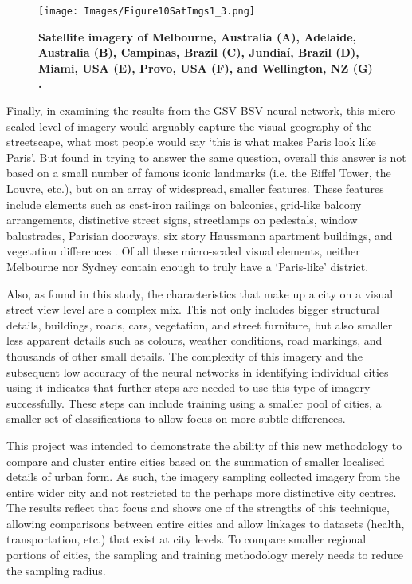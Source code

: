 \documentclass[Crown,sageh,times]{sagej}
\begin{document}
\begin{figure}[!htbp]
\centering    
\texttt{[image: Images/Figure10SatImgs1\_3.png]} 
 \caption{\bf Satellite imagery of Melbourne, Australia (A), Adelaide, Australia (B), Campinas, Brazil (C), Jundia\'{i}, Brazil (D), Miami, USA (E), Provo, USA (F), and Wellington, NZ (G) \citep{GoogleStatic2017}.}    
 \label{fig:satimages}  
\end{figure} 

Finally, in examining the results from the GSV-BSV neural network, this micro-scaled level of imagery would arguably capture the visual geography of the streetscape, what most people would say `this is what makes Paris look like Paris'. But \citet{Doersch2012} found in trying to answer the same question, overall this answer is not based on a small number of famous iconic landmarks (i.e. the Eiffel Tower, the Louvre, etc.), but on an array of widespread, smaller features. These features include elements such as cast-iron railings on balconies, grid-like balcony arrangements, distinctive street signs, streetlamps on pedestals, window balustrades, Parisian doorways, six story Haussmann apartment buildings, and vegetation differences \citep{Li2015}. Of all these micro-scaled visual elements, neither Melbourne nor Sydney contain enough to truly have a `Paris-like' district.

Also, as found in this study, the characteristics that make up a city on a visual street view level are a complex mix. This not only includes bigger structural details, buildings, roads, cars, vegetation, and street furniture, but also smaller less apparent details such as colours, weather conditions, road markings, and thousands of other small details. The complexity of this imagery and the subsequent low accuracy of the neural networks in identifying individual cities using it indicates that further steps are needed to use this type of imagery successfully. These steps can include training using a smaller pool of cities, a smaller set of classifications to allow focus on more subtle differences.

This project was intended to demonstrate the ability of this new methodology to compare and cluster entire cities based on the summation of smaller localised details of urban form. As such, the imagery sampling collected imagery from the entire wider city and not restricted to the perhaps more distinctive city centres. The results reflect that focus and shows one of the strengths of this technique, allowing comparisons between entire cities and allow linkages to datasets (health, transportation, etc.) that exist at city levels. To compare smaller regional portions of cities, the sampling and training methodology merely needs to reduce the sampling radius.
\end{document}
